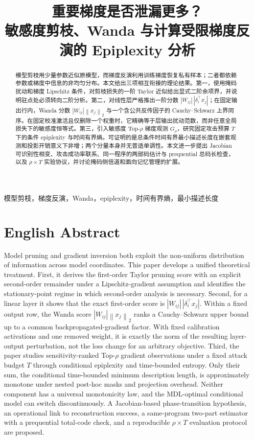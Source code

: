 \documentclass[conference,a4paper]{IEEEtran}
\title{重要梯度是否泄漏更多？\\
\large 敏感度剪枝、Wanda 与计算受限梯度反演的 Epiplexity 分析}
\author{\IEEEauthorblockN{Pruning Gradient Privacy Lab contributors}}
\newcommand{\norm}[1]{\left\lVert #1\right\rVert}
\begin{document}
\maketitle

\begin{abstract}
模型剪枝用少量参数近似原模型，而梯度反演利用训练梯度恢复私有样本；二者都依赖参数或梯度中信息的非均匀分布。本文给出三项相互衔接的理论结果。第一，使用掩码扰动和梯度 Lipschitz 条件，对剪枝损失的一阶 Taylor 近似给出显式二阶余项界，并说明驻点处必须转向二阶分析。第二，对线性层严格推出一阶分数 $|W_{ij}|\,|\delta_i^\top x_j|$；在固定输出行内，Wanda 分数 $|W_{ij}|\norm{x_j}_2$ 与一个含公共反传因子的 Cauchy--Schwarz 上界同序。在固定校准激活且仅删除一个权重时，它精确等于层输出扰动范数，而非任意全局损失下的敏感度恒等式。第三，引入敏感度 Top-$\rho$ 梯度观测 $G_\rho$，研究固定攻击预算 $T$ 下的条件 epiplexity 与时间有界熵。可证明的是总条件时间有界最小描述长度在嵌套观测和投影开销意义下非增；两个分量本身并无普适单调性。本文进一步提出 Jacobian 可识别性相变、攻击成功率联系、同一程序的两部码估计与 prequential 总码长检查，以及 $\rho\times T$ 实验协议，并讨论掩码侧信道和面向记忆管理的扩展。
\end{abstract}

\begin{IEEEkeywords}
模型剪枝，梯度反演，Wanda，epiplexity，时间有界熵，最小描述长度
\end{IEEEkeywords}

\section*{English Abstract}
Model pruning and gradient inversion both exploit the non-uniform distribution of information across model coordinates. This paper develops a unified theoretical treatment. First, it derives the first-order Taylor pruning score with an explicit second-order remainder under a Lipschitz-gradient assumption and identifies the stationary-point regime in which second-order analysis is necessary. Second, for a linear layer it shows that the exact first-order score is $|W_{ij}|\,|\delta_i^{\top}x_j|$. Within a fixed output row, the Wanda score $|W_{ij}|\norm{x_j}_2$ ranks a Cauchy--Schwarz upper bound up to a common backpropagated-gradient factor. With fixed calibration activations and one removed weight, it is exactly the norm of the resulting layer-output perturbation, not the loss change for an arbitrary objective. Third, the paper studies sensitivity-ranked Top-$\rho$ gradient observations under a fixed attack budget $T$ through conditional epiplexity and time-bounded entropy. Only their sum, the conditional time-bounded minimum description length, is approximately monotone under nested post-hoc masks and projection overhead. Neither component has a universal monotonicity law, and the MDL-optimal conditional model can switch discontinuously. A Jacobian-based phase-transition hypothesis, an operational link to reconstruction success, a same-program two-part estimator with a prequential total-code check, and a reproducible $\rho\times T$ evaluation protocol are proposed.
\end{document}
